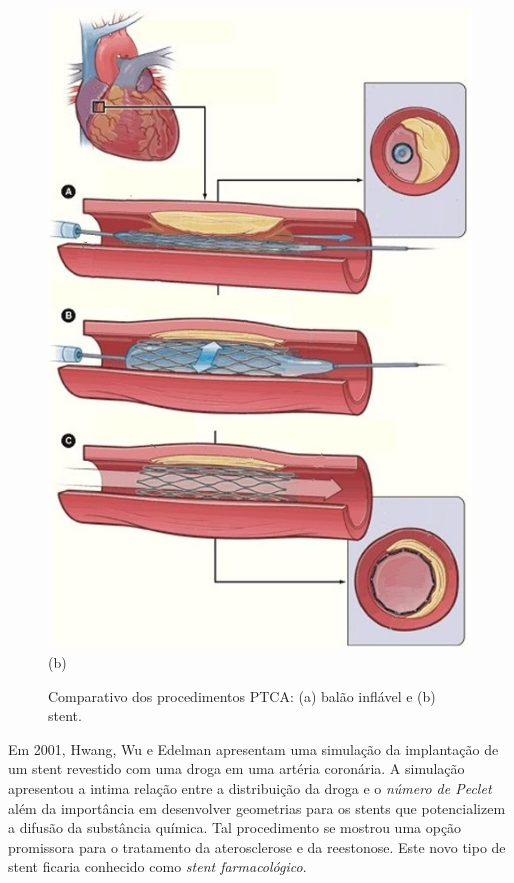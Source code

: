 \begin{figure}[H]
\begin{minipage}{.50\linewidth}
      \includegraphics[scale=0.5]{./02_chaps/cap_review/figure/stent_bare.jpg}\\
      (b)
     \end{minipage}
     \medskip
     \caption{Comparativo dos procedimentos PTCA:
              (a) balão inflável e
              (b) stent.}
     \label{procedimentos PTCA}
\end{figure}

\medskip
Em 2001, Hwang, Wu e Edelman \cite{hwang2001} apresentam uma simulação da implantação de um stent
revestido com uma droga em uma artéria coronária. A simulação apresentou a 
intima relação entre a distribuição da droga e o \textit{número de Peclet} 
além da importância em desenvolver geometrias para os stents que potencializem 
a difusão da substância química. Tal procedimento se mostrou uma opção promissora
para o tratamento da aterosclerose e da reestonose. Este novo tipo de stent
ficaria conhecido como \textit{stent farmacológico}.

